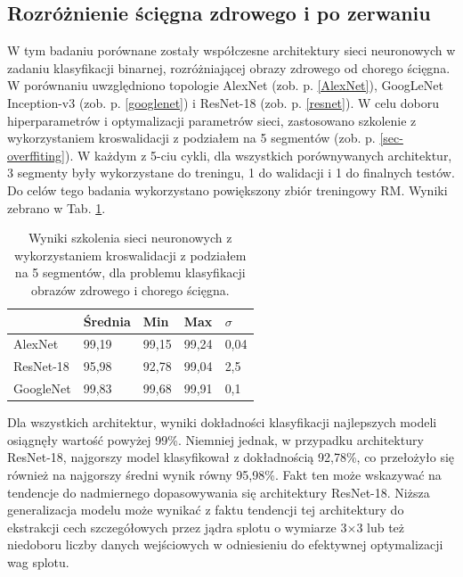 \subsection{Rozróżnienie ścięgna zdrowego i po zerwaniu}
\label{binaryMRI}
W tym badaniu porównane zostały współczesne architektury sieci neuronowych w zadaniu klasyfikacji binarnej, rozróżniającej obrazy zdrowego od chorego ścięgna. W porównaniu uwzględniono topologie AlexNet (zob. p. \ref{AlexNet}), GoogLeNet Inception-v3 (zob. p. \ref{googlenet}) i ResNet-18 (zob. p. \ref{resnet}). W celu doboru hiperparametrów i optymalizacji parametrów sieci, zastosowano szkolenie z wykorzystaniem kroswalidacji z podziałem na 5 segmentów (zob. p. \ref{sec-overffiting}). W każdym z 5-ciu cykli, dla wszystkich porównywanych architektur, 3 segmenty były wykorzystane do treningu, 1 do walidacji i 1 do finalnych testów. Do celów tego badania wykorzystano powiększony zbiór treningowy RM. Wyniki zebrano w Tab. \ref{tab:binary-cross-validation}.
\vspace{10px}
\renewcommand{\arraystretch}{1.2}
\begin{table}[h!]
	\setlength{\tabcolsep}{14pt}
	\centering
	\caption{Wyniki szkolenia sieci neuronowych z wykorzystaniem kroswalidacji z podziałem na 5 segmentów, dla problemu klasyfikacji obrazów zdrowego i chorego ścięgna.}
	\label{tab:binary-cross-validation}
	\begin{tabular}{l | l | l | l | l }
		 & Średnia & Min   & Max   & $\sigma$   \\ \hline \hline
		AlexNet   & 99,19 & 99,15 & 99,24 & 0,04 \\ \hline
		ResNet-18 & 95,98 & 92,78 & 99,04 & 2,5  \\ \hline
		GoogleNet & 99,83 & 99,68 & 99,91 & 0,1  \\ \hline
	\end{tabular}
\end{table}
\renewcommand{\arraystretch}{1}

Dla wszystkich architektur, wyniki dokładności klasyfikacji najlepszych modeli osiągnęły wartość powyżej 99\%. Niemniej jednak, w przypadku architektury ResNet-18, najgorszy model klasyfikował z dokładnością 92,78\%, co przełożyło się również na najgorszy średni wynik równy 95,98\%. Fakt ten może wskazywać na tendencje \linebreak do nadmiernego dopasowywania się architektury ResNet-18. Niższa generalizacja modelu może wynikać z faktu tendencji tej architektury do ekstrakcji cech szczegółowych przez jądra splotu o wymiarze 3$\times$3 lub też niedoboru liczby danych wejściowych w odniesieniu do efektywnej optymalizacji wag splotu.

